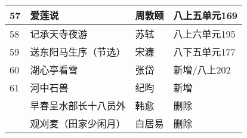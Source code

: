 \documentclass[12pt]{ctexart}
\begin{document}
\begin{longtable}{@{}llll@{}}
    57  & 爱莲说                       & 周敦颐    & 八上五单元169        \\* \midrule
    58  & 记承天寺夜游                    & 苏轼     & 八上六单元195        \\* \midrule
    59  & 送东阳马生序（节选）                & 宋濂     & 八下五单元177        \\* \midrule
    60  & 湖心亭看雪                     & 张岱     & 新增/八上202        \\* \midrule
    61  & 河中石兽                      & 纪昀     & 新增              \\* \midrule
        & 早春呈水部长十八员外                & 韩愈     & 删除              \\* \midrule
        & 观刈麦（田家少闲月）                & 白居易    & 删除              \\* \bottomrule
    \end{longtable}
\end{document}
